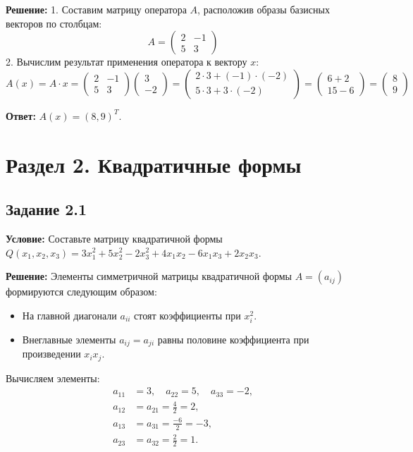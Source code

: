 \documentclass[11pt, a4paper]{article}
\begin{document}
\textbf{Решение:}
1. Составим матрицу оператора $A$, расположив образы базисных векторов по столбцам:
$$ A = \begin{pmatrix} 2 & -1 \\ 5 & 3 \end{pmatrix} $$
2. Вычислим результат применения оператора к вектору $x$:
$$ A(x) = A \cdot x = \begin{pmatrix} 2 & -1 \\ 5 & 3 \end{pmatrix} \begin{pmatrix} 3 \\ -2 \end{pmatrix} = \begin{pmatrix} 2\cdot 3 + (-1)\cdot(-2) \\ 5\cdot 3 + 3\cdot(-2) \end{pmatrix} = \begin{pmatrix} 6 + 2 \\ 15 - 6 \end{pmatrix} = \begin{pmatrix} 8 \\ 9 \end{pmatrix} $$

\textbf{Ответ:} $A(x) = (8, 9)^T$.

\newpage

\section{Раздел 2. Квадратичные формы}

\subsection*{Задание 2.1}
\textbf{Условие:} Составьте матрицу квадратичной формы $Q(x_1, x_2, x_3) = 3x_1^2 + 5x_2^2 - 2x_3^2 + 4x_1x_2 - 6x_1x_3 + 2x_2x_3$.

\textbf{Решение:}
Элементы симметричной матрицы квадратичной формы $A = (a_{ij})$ формируются следующим образом:
\begin{itemize}
\item На главной диагонали $a_{ii}$ стоят коэффициенты при $x_i^2$.
\item Внеглавные элементы $a_{ij} = a_{ji}$ равны половине коэффициента при произведении $x_i x_j$.
\end{itemize}

Вычисляем элементы:
\begin{align*}
a_{11} &= 3, \quad a_{22} = 5, \quad a_{33} = -2, \\
a_{12} &= a_{21} = \frac{4}{2} = 2, \\
a_{13} &= a_{31} = \frac{-6}{2} = -3, \\
a_{23} &= a_{32} = \frac{2}{2} = 1.
\end{align*}
\end{document}
